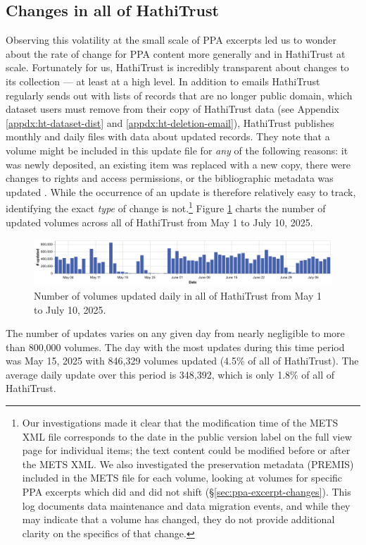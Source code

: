 \documentclass[final]{anthology-ch} %
\begin{document}
\subsection{Changes in all of HathiTrust}

Observing this volatility at the small scale of PPA excerpts led us to wonder about the rate of change for PPA content more generally and in HathiTrust at scale. Fortunately for us, HathiTrust is incredibly transparent about changes to its collection — at least at a high level. In addition to emails HathiTrust regularly sends out with lists of records that are no longer public domain, which dataset users must remove from their copy of HathiTrust data (see Appendix \ref{appdx:ht-dataset-dist} and \ref{appdx:ht-deletion-email}), HathiTrust publishes monthly and daily files with data about updated records. They note that a volume might be included in this update file for \textit{any} of the following reasons: it was newly deposited, an existing item was replaced with a new copy, there were changes to rights and access permissions, or the bibliographic metadata was updated \cite{noauthor_hathifiles_nodate}. While the occurrence of an update is therefore relatively easy to track, identifying the exact \textit{type} of change is not.\footnote{Our investigations made it clear that the modification time of the METS XML file corresponds to the date in the public version label on the full view page for individual items; the text content could be modified before or after the METS XML. We also investigated the preservation metadata (PREMIS) included in the METS file for each volume, looking at volumes for specific PPA excerpts which did and did not shift (§\ref{sec:ppa-excerpt-changes}). This log documents data maintenance and data migration events, and while they may indicate that a volume has changed, they do not provide additional clarity on the specifics of that change.} Figure \ref{fig:hathi-daily-updates} charts the number of updated volumes across all of HathiTrust from May 1 to July 10, 2025.
\begin{figure}[t!]
    \centering
    \includegraphics[width=1\linewidth]{images/hathitrust_changes_countonly.png}
    \caption{Number of volumes updated daily in all of HathiTrust from May 1 to July 10, 2025.}
    \label{fig:hathi-daily-updates}
\end{figure}
The number of updates varies on any given day from nearly negligible to more than 800,000 volumes. The day with the most updates during this time period was May 15, 2025 with 846,329 volumes updated (4.5\% of all of HathiTrust). The average daily update over this period is 348,392, which is only 1.8\% of all of HathiTrust.
\end{document}
